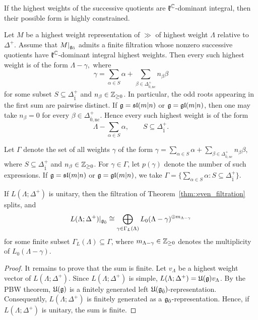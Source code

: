 If the highest weights of the successive quotients are
$\kk^{\CC}$-dominant integral, then their possible form is highly
constrained.

\begin{theorem}
\label{thm::even_filtration}
Let $M$ be a highest weight representation of $\gg$ of highest weight
$\Lambda$ relative to $\Delta^{+}$. Assume that
$M\vert_{\even}$ admits a finite filtration whose nonzero successive
quotients have $\kk^{\CC}$-dominant integral highest weights. Then
every such highest weight is of the form $\Lambda-\gamma,$
where \[\gamma=\sum_{\alpha\in S}\alpha+\sum_{\beta\in\Delta_{\bar0,\mathrm{nc}}^{+}}
n_{\beta}\beta\]
for some subset $S\subseteq\Delta_{\bar1}^{+}$ and
$n_{\beta}\in\ZZ_{\geq0}$. In particular, the odd roots appearing in
the first sum are pairwise distinct. If $\gg=\sl(m\vert n)$ or $\gg=\gl(m\vert n)$, then one may take
$n_{\beta}=0$ for every
$\beta\in\Delta_{\bar0,\mathrm{nc}}^{+}$. Hence every such highest
weight is of the form
\[
\Lambda-\sum_{\alpha\in S}\alpha,
\qquad
S\subseteq\Delta_{\bar1}^{+}.
\]
\end{theorem}

Let $\Gamma$ denote the set of all weights $\gamma$ of the form $\gamma=\sum_{\alpha\in S}\alpha+\sum_{\beta\in\Delta_{\bar0,nc}^{+}}n_{\beta}\beta$, where $S\subseteq\Delta_{\bar1}^{+}$ and $n_{\beta}\in\ZZ_{\geq0}$. For $\gamma\in\Gamma$, let $p(\gamma)$ denote the number of such expressions. If $\gg=\sl(m\vert n)$ or $\gg=\gl(m\vert n)$, we take $\Gamma=\{\sum_{\alpha\in S}\alpha:S\subseteq\Delta_{\bar1}^{+}\}$.

\begin{corollary}
\label{corollary::even-filtration-simple}
If $L(\Lambda;\Delta^+)$ is unitary, then the filtration of Theorem~\ref{thm::even_filtration} splits, and $$L(\Lambda;\Delta^+)\vert_{\even}\cong\bigoplus_{\gamma\in\Gamma_{L}(\Lambda)}L_0(\Lambda-\gamma)^{\oplus m_{\Lambda-\gamma}}$$ for some finite subset $\Gamma_{L}(\Lambda)\subseteq\Gamma$, where $m_{\Lambda-\gamma}\in\ZZ_{\geq0}$ denotes the multiplicity of $L_0(\Lambda-\gamma)$. 
\end{corollary}

\begin{proof}
 It remains to prove that the sum is finite. Let $v_{\Lambda}$ be a highest weight vector of $L(\Lambda;\Delta^{+})$. Since $L(\Lambda;\Delta^{+})$ is simple, $L(\Lambda;\Delta^{+})=\UE(\gg)v_{\Lambda}$. By the PBW theorem, $\UE(\gg)$ is a finitely generated left
$\UE(\even)$-representation. 
Consequently, $L(\Lambda;\Delta^{+})$ is finitely generated as a $\even$-representation. Hence, if $L(\Lambda;\Delta^{+})$ is unitary, the sum is finite. 
\end{proof}




